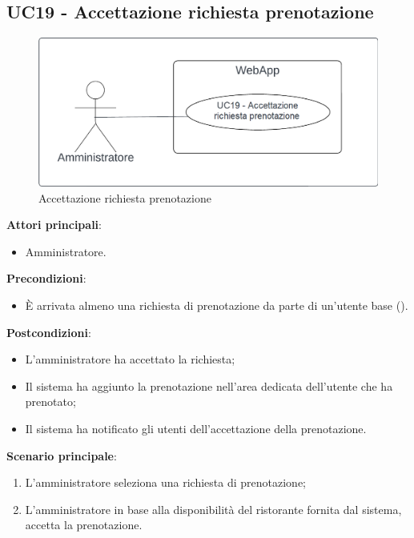 \subsection{UC19 - Accettazione richiesta prenotazione}\label{usecase:19}
\begin{figure}[H]
    \centering
    \includegraphics[width=0.9\linewidth]{ucd/ucd19.png}
    \caption{Accettazione richiesta prenotazione}
\end{figure}
\textbf{Attori principali}:
\begin{itemize}
    \item Amministratore.
\end{itemize}
\textbf{Precondizioni}:
\begin{itemize}
    \item \`E arrivata almeno una richiesta di prenotazione da parte di un'utente base ().
\end{itemize}
\textbf{Postcondizioni}:
\begin{itemize}
    \item L'amministratore ha accettato la richiesta;
    \item Il sistema ha aggiunto la prenotazione nell'area dedicata dell'utente che ha prenotato;
    \item Il sistema ha notificato gli utenti dell'accettazione della prenotazione.
\end{itemize}
\textbf{Scenario principale}:
\begin{enumerate}
    \item L'amministratore seleziona una richiesta di prenotazione;
    \item L'amministratore in base alla disponibilità del ristorante fornita dal sistema, accetta la prenotazione.
\end{enumerate}

\newpage

